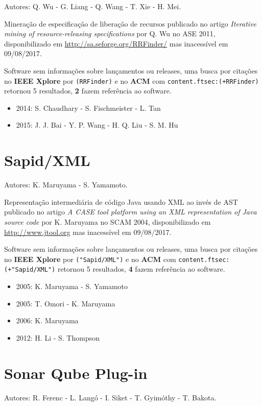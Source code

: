 Autores:
Q. Wu - G. Liang - Q. Wang - T. Xie - H. Mei.

Mineração de especificação de liberação de recursos
publicado no artigo {\it Iterative mining of resource-releasing specifications}
por Q. Wu
no ASE 2011,
disponibilizado em \url{http://sa.seforge.org/RRFinder/}
mas inacessível em 09/08/2017.

Software sem informações sobre lançamentos ou releases,
uma busca por citações no {\bf IEEE Xplore} por
\texttt{(RRFinder)}
e no {\bf ACM} com
\texttt{content.ftsec:(+RRFinder)}
retornou
5 resultados,
{\bf 2} fazem referência ao software.

\begin{itemize}
\item 2014: S. Chaudhary - S. Fischmeister - L. Tan
\item 2015: J. J. Bai - Y. P. Wang - H. Q. Liu - S. M. Hu
\end{itemize}

\section{Sapid/XML}

Autores:
K. Maruyama - S. Yamamoto.

Representação intermediária de código Java usando XML ao invés de AST
publicado no artigo {\it A CASE tool platform using an XML representation of Java source code}
por K. Maruyama
no SCAM 2004,
disponibilizado em \url{http://www.jtool.org}
mas inacessível em 09/08/2017.

Software sem informações sobre lançamentos ou releases,
uma busca por citações no {\bf IEEE Xplore} por
\texttt{("Sapid/XML")}
e no {\bf ACM} com
\texttt{content.ftsec:(+"Sapid/XML")}
retornou
5 resultados,
{\bf 4} fazem referência ao software.

\begin{itemize}
\item 2005: K. Maruyama - S. Yamamoto
\item 2005: T. Omori - K. Maruyama
\item 2006: K. Maruyama
\item 2012: H. Li - S. Thompson
\end{itemize}

\section{Sonar Qube Plug-in}

Autores:
R. Ferenc - L. Langó - I. Siket - T. Gyimóthy - T. Bakota.

